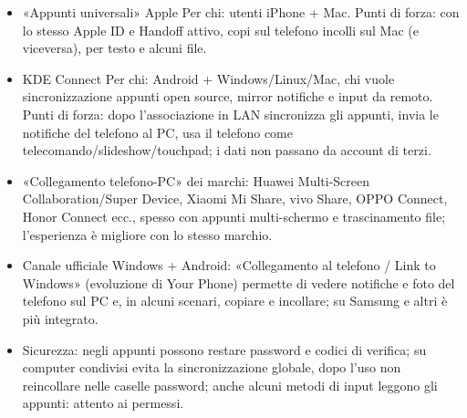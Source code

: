 \begin{itemize}
  \item «Appunti universali» Apple Per chi: utenti iPhone + Mac. Punti di forza: con lo stesso Apple ID e Handoff attivo, copi sul telefono incolli sul Mac (e viceversa), per testo e alcuni file.
  \item KDE Connect Per chi: Android + Windows/Linux/Mac, chi vuole sincronizzazione appunti open source, mirror notifiche e input da remoto. Punti di forza: dopo l'associazione in LAN sincronizza gli appunti, invia le notifiche del telefono al PC, usa il telefono come telecomando/slideshow/touchpad; i dati non passano da account di terzi.
  \item «Collegamento telefono-PC» dei marchi: Huawei Multi-Screen Collaboration/Super Device, Xiaomi Mi Share, vivo Share, OPPO Connect, Honor Connect ecc., spesso con appunti multi-schermo e trascinamento file; l'esperienza è migliore con lo stesso marchio.
  \item Canale ufficiale Windows + Android: «Collegamento al telefono / Link to Windows» (evoluzione di Your Phone) permette di vedere notifiche e foto del telefono sul PC e, in alcuni scenari, copiare e incollare; su Samsung e altri è più integrato.
  \item Sicurezza: negli appunti possono restare password e codici di verifica; su computer condivisi evita la sincronizzazione globale, dopo l'uso non reincollare nelle caselle password; anche alcuni metodi di input leggono gli appunti: attento ai permessi.
\end{itemize}


